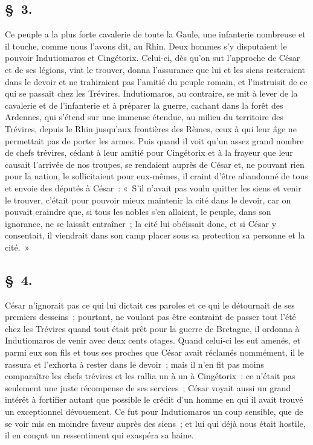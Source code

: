 \documentclass[french,twoside]{book} %
\begin{document}
\subsection[{§ 3.}]{ \textsc{§ 3.} }
\noindent Ce peuple a la plus forte cavalerie de toute la Gaule, une infanterie nombreuse et il touche, comme nous l’avons dit, au Rhin. Deux hommes s’y disputaient le pouvoir Indutiomaros et Cingétorix. Celui-ci, dès qu’on sut l’approche de César et de ses légions, vint le trouver, donna l’assurance que lui et les siens resteraient dans le devoir et ne trahiraient pas l’amitié du peuple romain, et l’instruisit de ce qui se passait chez les Trévires. Indutiomaros, au contraire, se mit à lever de la cavalerie et de l’infanterie et à préparer la guerre, cachant dans la forêt des Ardennes, qui s’étend sur une immense étendue, au milieu du territoire des Trévires, depuis le Rhin jusqu’aux frontières des Rèmes, ceux à qui leur âge ne permettait pas de porter les armes. Puis quand il voit qu’un assez grand nombre de chefs trévires, cédant à leur amitié pour Cingétorix et à la frayeur que leur causait l’arrivée de nos troupes, se rendaient auprès de César et, ne pouvant rien pour la nation, le sollicitaient pour eux-mêmes, il craint d’être abandonné de tous et envoie des députés à César : « S'il n’avait pas voulu quitter les siens et venir le trouver, c’était pour pouvoir mieux maintenir la cité dans le devoir, car on pouvait craindre que, si tous les nobles s’en allaient, le peuple, dans son ignorance, ne se laissât entraîner ; la cité lui obéissait donc, et si César y consentait, il viendrait dans son camp placer sous sa protection sa personne et la cité. »
\subsection[{§ 4.}]{ \textsc{§ 4.} }
\noindent César n’ignorait pas ce qui lui dictait ces paroles et ce qui le détournait de ses premiers desseins ; pourtant, ne voulant pas être contraint de passer tout l’été chez les Trévires quand tout était prêt pour la guerre de Bretagne, il ordonna à Indutiomaros de venir avec deux cents otages. Quand celui-ci les eut amenés, et parmi eux son fils et tous ses proches que César avait réclamés nommément, il le rassura et l’exhorta à rester dans le devoir ; mais il n’en fit pas moins comparaître les chefs trévires et les rallia un à un à Cingétorix : ce n’était pas seulement une juste récompense de ses services ; César voyait aussi un grand intérêt à fortifier autant que possible le crédit d’un homme en qui il avait trouvé un exceptionnel dévouement. Ce fut pour Indutiomaros un coup sensible, que de se voir mis en moindre faveur auprès des siens ; et lui qui déjà nous était hostile, il en conçut un ressentiment qui exaspéra sa haine.
\end{document}
